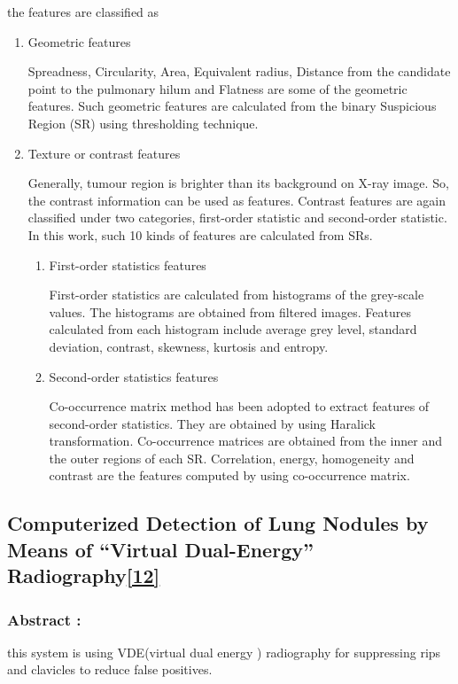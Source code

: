 \documentclass[hidelinks,12pt]{article}
\begin{document}
the features are classified as
\begin{enumerate}
\item Geometric features

Spreadness, Circularity, Area, Equivalent radius, Distance from the candidate point to the
pulmonary hilum and Flatness are some of the geometric features. Such geometric
features are calculated from the binary Suspicious Region (SR) using thresholding technique.

\item Texture or contrast features

Generally, tumour region is brighter than its background on X-ray image. So, the contrast
information can be used as features. Contrast features are again classified under two
categories, first-order statistic and second-order statistic. In this work, such 10 kinds of
features are calculated from SRs.
\begin{enumerate}
\item First-order statistics features

First-order statistics are calculated from histograms of the grey-scale values. The
histograms are obtained from filtered images. Features calculated from each histogram
include average grey level, standard deviation, contrast, skewness, kurtosis and entropy.

\item Second-order statistics features

Co-occurrence matrix method has been adopted to extract features of second-order
statistics. They are obtained by using Haralick transformation. Co-occurrence
matrices are obtained from the inner and the outer regions of each SR. Correlation,
energy, homogeneity and contrast are the features computed by using co-occurrence
matrix.
\end{enumerate}
\end{enumerate}




\newpage
\subsection{Computerized Detection of Lung Nodules by Means
of “Virtual Dual-Energy” Radiography\hyperref[12]{[12]}}

\subsubsection{Abstract :}
this system is using VDE(virtual dual energy ) radiography for suppressing rips and clavicles to reduce false positives.
\end{document}
